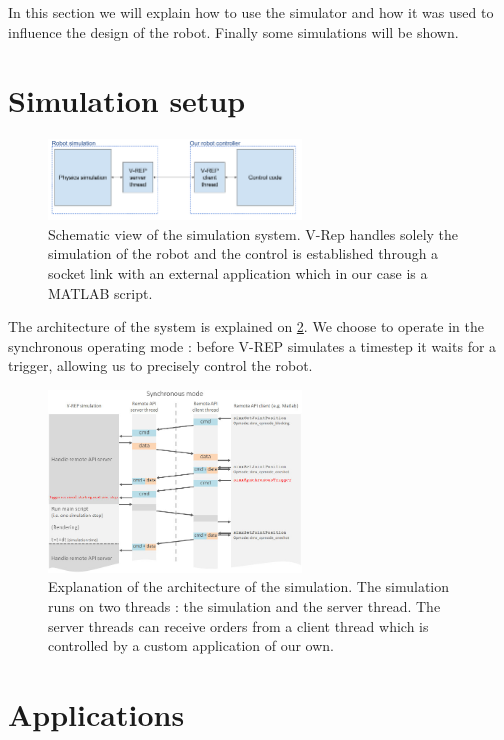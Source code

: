 In this section we will explain how to use the simulator and how it was used to influence the design of the robot. Finally some simulations will be shown.

\section{Simulation setup}
\begin{figure}[htp]
\center
    \includegraphics[width = 0.6\textwidth]{figures/simulation_principles}
    \caption{Schematic view of the simulation system. V-Rep handles solely the simulation of the robot and the control is established through a socket link with an external application which in our case is a MATLAB script.}
    \label{fig:simulation_principles}
\end{figure}

The architecture of the system is explained on \cref{fig:remoteApi}. We choose to operate in the synchronous operating mode : before V-REP simulates a timestep it waits for a trigger, allowing us to precisely control the robot.

\begin{figure}[htp]
\center
\includegraphics[width=0.6\textwidth]{figures/remoteApiSynchronous}
\caption[Simulation setup]{Explanation of the architecture of the simulation. The simulation runs on two threads : the simulation and the server thread. The server threads can receive orders from a client thread which is controlled by a custom application of our own.}
\label{fig:remoteApi}
\end{figure}

\section{Applications}
